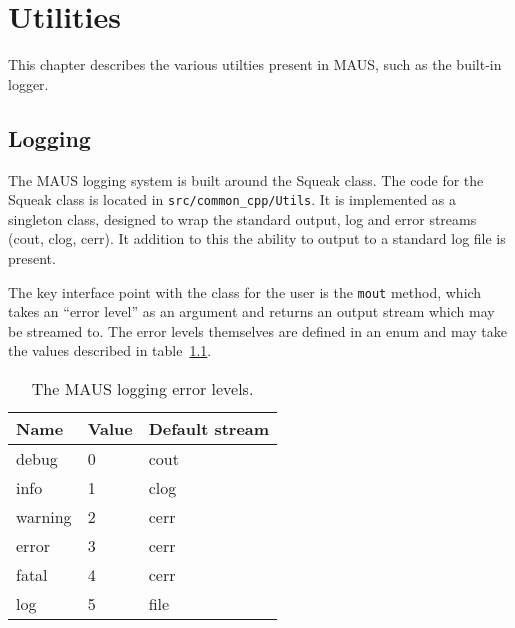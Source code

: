 


\chapter{Utilities}
\label{chapter:logging}
This chapter describes the various utilties present in MAUS, such as the built-in logger.

\section{Logging}
The MAUS logging system is built around the Squeak class. The code for the Squeak class is located in \texttt{src/common\_cpp/Utils}. It is implemented as a singleton class, designed to wrap the standard output, log and error streams (cout, clog, cerr). It addition to this the ability to output to a standard log file is present. 

The key interface point with the class for the user is the \texttt{mout} method, which takes an ``error level'' as an argument and returns an output stream which may be streamed to. The error levels themselves are defined in an enum and may take the values described in table~\ref{table:LoggingLevels}.

\begin{table}[htb]
 \begin{center}
	\begin{tabular}{| l | l | l |}
	 \hline
	 \textbf{Name} & \textbf{Value} & \textbf{Default stream} \\
	 \hline
	 debug & 0 & cout \\
	 info & 1 & clog \\
	 warning & 2 & cerr \\
	 error & 3 & cerr \\
	 fatal & 4 & cerr \\
	 log & 5 & file \\
	 \hline
	\end{tabular}
  \caption{\label{table:LoggingLevels} The MAUS logging error levels.}
 \end{center}
\end{table}

